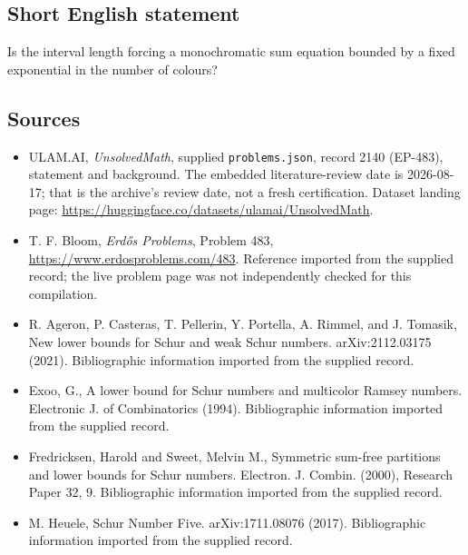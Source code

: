 \documentclass[11pt,a4paper]{article}
\begin{document}
\subsection{Short English statement}

Is the interval length forcing a monochromatic sum equation bounded by a fixed exponential in the number of colours?

\subsection{Sources}

{\small

\begin{itemize}

\item[\hypertarget{source:2140:1}{S1}] ULAM.AI, \emph{UnsolvedMath}, supplied \texttt{problems.json}, record 2140 (EP-483), statement and background. The embedded literature-review date is 2026-08-17; that is the archive’s review date, not a fresh certification. Dataset landing page: \url{https://huggingface.co/datasets/ulamai/UnsolvedMath}.

\item[\hypertarget{source:2140:2}{S2}] T. F. Bloom, \emph{Erdős Problems}, Problem 483, \url{https://www.erdosproblems.com/483}. Reference imported from the supplied record; the live problem page was not independently checked for this compilation.

\item[\hypertarget{source:2140:3}{S3}] R. Ageron, P. Casteras, T. Pellerin, Y. Portella, A. Rimmel, and J. Tomasik, New lower bounds for Schur and weak Schur numbers. arXiv:2112.03175 (2021). Bibliographic information imported from the supplied record.

\item[\hypertarget{source:2140:4}{S4}] Exoo, G., A lower bound for Schur numbers and multicolor Ramsey numbers. Electronic J. of Combinatorics (1994). Bibliographic information imported from the supplied record.

\item[\hypertarget{source:2140:5}{S5}] Fredricksen, Harold and Sweet, Melvin M., Symmetric sum-free partitions and lower bounds for {S}chur numbers. Electron. J. Combin. (2000), Research Paper 32, 9. Bibliographic information imported from the supplied record.

\item[\hypertarget{source:2140:6}{S6}] M. Heuele, Schur Number Five. arXiv:1711.08076 (2017). Bibliographic information imported from the supplied record.

\end{itemize}

}

\label{end:2140}
\end{document}
